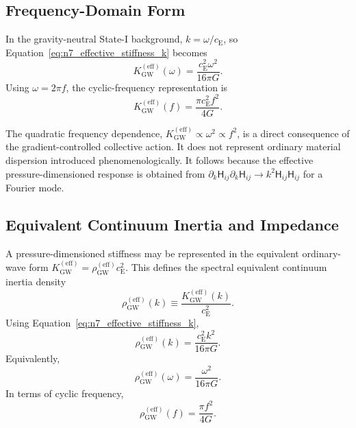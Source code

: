 \subsection{Frequency-Domain Form}
\label{subsec:n7_frequency_response}

In the gravity-neutral State-I background, $k = \omega/c_{\mathrm{E}}$, so Equation~\eqref{eq:n7_effective_stiffness_k} becomes
\begin{equation}
    K_{\mathrm{GW}}^{(\mathrm{eff})}(\omega) = \frac{c_{\mathrm{E}}^{2}\omega^{2}}{16\pi G}.
    \label{eq:n7_effective_stiffness_omega}
\end{equation}
Using $\omega = 2\pi f$, the cyclic-frequency representation is
\begin{equation}
    K_{\mathrm{GW}}^{(\mathrm{eff})}(f) = \frac{\pi c_{\mathrm{E}}^{2}f^{2}}{4G}.
    \label{eq:n7_effective_stiffness_f}
\end{equation}

The quadratic frequency dependence, $K_{\mathrm{GW}}^{(\mathrm{eff})} \propto \omega^{2} \propto f^{2}$, is a direct consequence of the gradient-controlled collective action. It does not represent ordinary material dispersion introduced phenomenologically. It follows because the effective pressure-dimensioned response is obtained from $\partial_{k}\mathsf{H}_{ij} \partial_{k}\mathsf{H}_{ij} \longrightarrow k^{2} \mathsf{H}_{ij} \mathsf{H}_{ij}$ for a Fourier mode.

\subsection{Equivalent Continuum Inertia and Impedance}
\label{subsec:n7_equivalent_continuum}

A pressure-dimensioned stiffness may be represented in the equivalent ordinary-wave form $K_{\mathrm{GW}}^{(\mathrm{eff})} = \rho_{\mathrm{GW}}^{(\mathrm{eff})} c_{\mathrm{E}}^{2}$. This defines the spectral equivalent continuum inertia density
\begin{equation}
    \rho_{\mathrm{GW}}^{(\mathrm{eff})}(k) \equiv \frac{K_{\mathrm{GW}}^{(\mathrm{eff})}(k)}{c_{\mathrm{E}}^{2}}.
    \label{eq:n7_effective_density_definition}
\end{equation}
Using Equation~\eqref{eq:n7_effective_stiffness_k},
\begin{equation}
    \rho_{\mathrm{GW}}^{(\mathrm{eff})}(k) = \frac{c_{\mathrm{E}}^{2}k^{2}}{16\pi G}.
    \label{eq:n7_effective_density_k}
\end{equation}
Equivalently,
\begin{equation}
    \rho_{\mathrm{GW}}^{(\mathrm{eff})}(\omega) = \frac{\omega^{2}}{16\pi G}.
    \label{eq:n7_effective_density_omega}
\end{equation}
In terms of cyclic frequency,
\begin{equation}
    \rho_{\mathrm{GW}}^{(\mathrm{eff})}(f) = \frac{\pi f^{2}}{4G}.
    \label{eq:n7_effective_density_f}
\end{equation}

